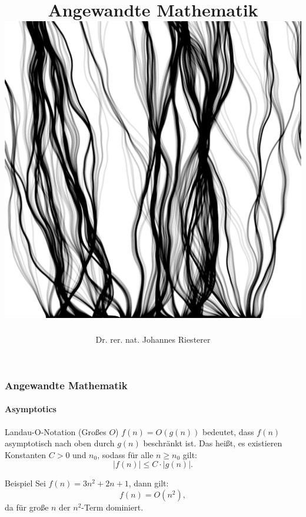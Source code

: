 \documentclass{beamer}
\begin{document}
\title[Angewandte Mathematik] %
{Angewandte Mathematik
\\
\includegraphics[scale=0.15]{images/cover}
}
\subtitle{}
\author[Dr. Johannes Riesterer] %
{Dr.  rer. nat. Johannes Riesterer}

\date[KPT 2004] %
{}

\subject{Angewandte Mathematik}

\frame{\titlepage}

\begin{frame}
    \frametitle{Angewandte Mathematik}
    \framesubtitle{Asymptotics}
    \begin{block}{Landau-O-Notation (Großes \( O \))}
    \( f(n) = O(g(n)) \) bedeutet, dass \( f(n) \) asymptotisch nach oben durch \( g(n) \) beschränkt ist. Das heißt, es existieren Konstanten \( C > 0 \) und \( n_0 \), sodass für alle \( n \geq n_0 \) gilt:
    \[
    |f(n)| \leq C \cdot |g(n)|.
    \]
    \end{block}

    \begin{exampleblock}{Beispiel} 
    Sei \( f(n) = 3n^2 + 2n + 1 \), dann gilt:
    \[
    f(n) = O(n^2),
    \]
    da für große \( n \) der \( n^2 \)-Term dominiert.
    \end{exampleblock}
\end{frame}
\end{document}
